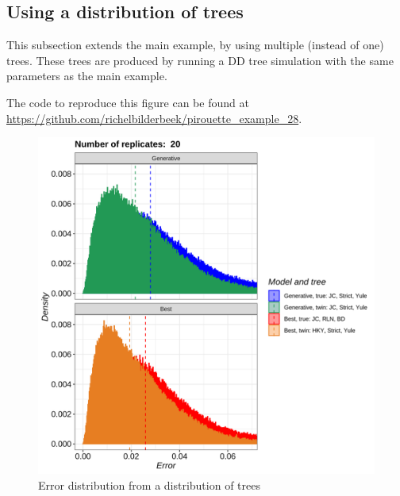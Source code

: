 



\subsection{Using a distribution of trees}
\label{subsec:distribution}

This subsection extends the main example, by using multiple (instead of
one) trees. These trees are produced by running a DD tree simulation
with the same parameters as the main example.

The code to reproduce this figure can be found at  
\url{https://github.com/richelbilderbeek/pirouette_example_28}.

\begin{figure}[H]
  \includegraphics[width=\textwidth]{pirouette_example_28/errors.png}
  \caption{Error distribution from a distribution of trees}
\end{figure}

